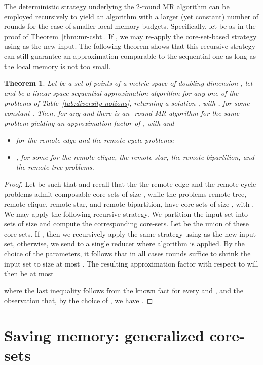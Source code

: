 \documentclass{article}
\newtheorem{theorem}{Theorem}
\begin{document}
The deterministic strategy underlying the 2-round MR algorithm can be
employed recursively to yield an algorithm with a larger (yet
constant) number of rounds for the case of smaller local memory
budgets. Specifically, let  be as in the
proof of Theorem~\ref{thm:mr-csbt}.  If , we may re-apply the
core-set-based strategy using  as the new input.  The following
theorem shows that this recursive
strategy can still guarantee an approximation comparable to the
sequential one as long as the local memory  is not too small.
\begin{theorem} \label{thm-multi-rounds} Let  be a set of 
  points of a metric space of doubling dimension , let and  be a
  linear-space sequential approximation algorithm for any one of the
  problems of Table~\ref{tab:diversity-notions}, returning a solution
  , with ,
  for some constant .  Then, for any
   and  there is an
  -round MR algorithm for the same problem
  yielding an approximation factor of , with 
  and
  \begin{itemize}
  \item  for the remote-edge
    and the remote-cycle problems;
  \item , for some  for the remote-clique,
    the remote-star, the remote-bipartition, and the remote-tree
    problems.
  \end{itemize}
\end{theorem}
\begin{proof}
  Let  be such that
   and recall that the the remote-edge and the remote-cycle
  problems admit composable core-sets of size ,
  while the problems remote-tree, remote-clique, remote-star, and remote-bipartition,
  have core-sets of size , with
  . We may apply the following recursive
  strategy. We partition the input set  into  sets of size
   and compute the corresponding core-sets. Let  be the union
  of these core-sets. If , then we recursively apply the
  same strategy using  as the new input set, otherwise, we send 
  to a single reducer where algorithm  is applied. By the choice of
  the parameters, it follows that in all cases 
  rounds suffice to shrink the input set to size at most . The
  resulting approximation factor with respect to 
  will then be at most
   
  where the last inequality follows from the known fact
   for every  and , and
  the observation that, by the choice of , we have
  .
\end{proof}


\section{Saving memory: generalized \mbox{core-sets}} \label{sec:generalized}
\end{document}
